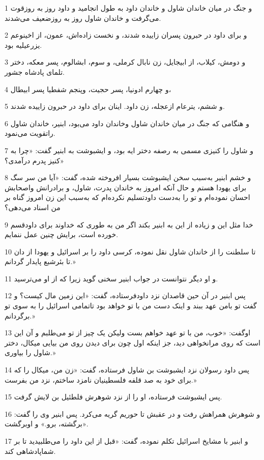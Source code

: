 \par 1 و جنگ در میان خاندان شاول و خاندان داود به طول انجامید و داود روز به روزقوت می‌گرفت و خاندان شاول روز به روزضعیف می‌شدند.
\par 2 و برای داود در حبرون پسران زاییده شدند، و نخست زاده‌اش، عمون، از اخینوعم یزرعیلیه بود.
\par 3 و دومش، کیلاب، از ابیجایل، زن نابال کرملی، و سوم، ابشالوم، پسر معکه، دختر تلمای پادشاه جشور.
\par 4 و چهارم ادونیا، پسر حجیت، وپنجم شفطیا پسر ابیطال،
\par 5 و ششم، یترعام ازعجله، زن داود. اینان برای داود در حبرون زاییده شدند.
\par 6 و هنگامی که جنگ در میان خاندان شاول وخاندان داود می‌بود، ابنیر، خاندان شاول راتقویت می‌نمود.
\par 7 و شاول را کنیزی مسمی به رصفه دختر ایه بود، و ایشبوشت به ابنیر گفت: «چرا به کنیز پدرم درآمدی؟»
\par 8 و خشم ابنیر به‌سبب سخن ایشبوشت بسیار افروخته شده، گفت: «آیا من سر سگ برای یهودا هستم و حال آنکه امروز به خاندان پدرت، شاول، و برادرانش واصحابش احسان نموده‌ام و تو را به‌دست داودتسلیم نکرده‌ام که به‌سبب این زن امروز گناه بر من اسناد می‌دهی؟
\par 9 خدا مثل این و زیاده از این به ابنیر بکند اگر من به طوری که خداوند برای داودقسم خورده است، برایش چنین عمل ننمایم.
\par 10 تا سلطنت را از خاندان شاول نقل نموده، کرسی داود را بر اسرائیل و یهودا از دان تا بئرشبع پایدار گردانم.»
\par 11 و او دیگر نتوانست در جواب ابنیر سخنی گوید زیرا که از او می‌ترسید.
\par 12 پس ابنیر در آن حین قاصدان نزد داودفرستاده، گفت: «این زمین مال کیست؟ و گفت تو بامن عهد ببند و اینک دست من با تو خواهد بود تاتمامی اسرائیل را به سوی تو برگردانم.»
\par 13 اوگفت: «خوب، من با تو عهد خواهم بست ولیکن یک چیز از تو می‌طلبم و آن این است که روی مرانخواهی دید، جز اینکه اول چون برای دیدن روی من بیایی میکال، دختر شاول را بیاوری.»
\par 14 پس داود رسولان نزد ایشبوشت بن شاول فرستاده، گفت: «زن من، میکال را که برای خود به صد قلفه فلسطینیان نامزد ساختم، نزد من بفرست.»
\par 15 پس ایشبوشت فرستاده، او را از نزد شوهرش فلطئیل بن لایش گرفت.
\par 16 و شوهرش همراهش رفت و در عقبش تا حوریم گریه می‌کرد. پس ابنیر وی را گفت: «برگشته، برو.» و اوبرگشت.
\par 17 و ابنیر با مشایخ اسرائیل تکلم نموده، گفت: «قبل از این داود را می‌طلبیدید تا بر شماپادشاهی کند.
